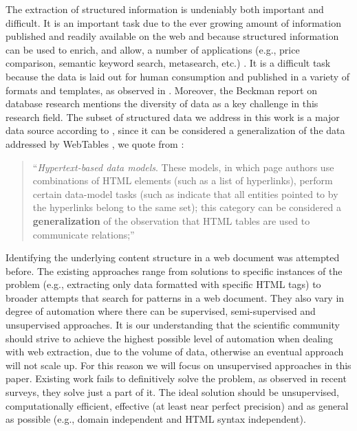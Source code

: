 \documentclass{vldb}
\begin{document}
The extraction of structured information is undeniably both important and
difficult. It is an important task due to the ever growing amount of information
published and readily available on the web and because structured information
can be used to enrich, and allow, a number of applications (e.g., price
comparison, semantic keyword search, metasearch, etc.)
\cite{relationalWeb2008,kalyanpur2012structured,2015webtables}.
It is a difficult task because the data is laid out for human consumption and
published in a variety of formats and templates, as observed in
\cite{structured2011}. Moreover, the Beckman report on database
research\cite{abadi2014beckman} mentions the diversity of data as a key
challenge in this research field. The subset of structured data we address in
this work is a major data source according to \cite{structured2011}, since it
can be considered a generalization of the data addressed by WebTables
\cite{webtables2008}, we quote from \cite{structured2011}:
\begin{quote} 
``\textit{Hypertext-based data models}. These models, in which page authors use
combinations of HTML elements (such as a list of hyperlinks), perform certain 
data-model tasks (such as indicate that all entities pointed to by the
hyperlinks belong to the same set); this category can be considered a
\textbf{generalization} of the observation that HTML tables are used to
communicate relations;''
\end{quote}

Identifying the underlying content structure in a web document was attempted
before. The existing approaches range from solutions to specific instances of
the problem (e.g., extracting only data formatted with specific HTML
tags\cite{webtables2008,listExtract2009,qiu2015dexter}) to broader attempts that
search for patterns in a web
document\cite{MDR03,NET05,depta05,TPC09,grigalis2013towards}.
They also vary in degree of automation where there can be supervised,
semi-supervised and unsupervised approaches. It is our understanding that the
scientific community should strive to achieve the highest possible level of
automation when dealing with web extraction, due to the volume of data,
otherwise an eventual approach will not scale up. For this reason we will focus
on unsupervised approaches in this paper.
Existing work fails to definitively solve the problem, as observed in recent
surveys\cite{survey2013,survey2014}, they solve just a part of it. The ideal
solution should be unsupervised, computationally efficient, effective (at
least near perfect precision) and as general as possible (e.g., domain
independent and HTML syntax independent).
\end{document}
